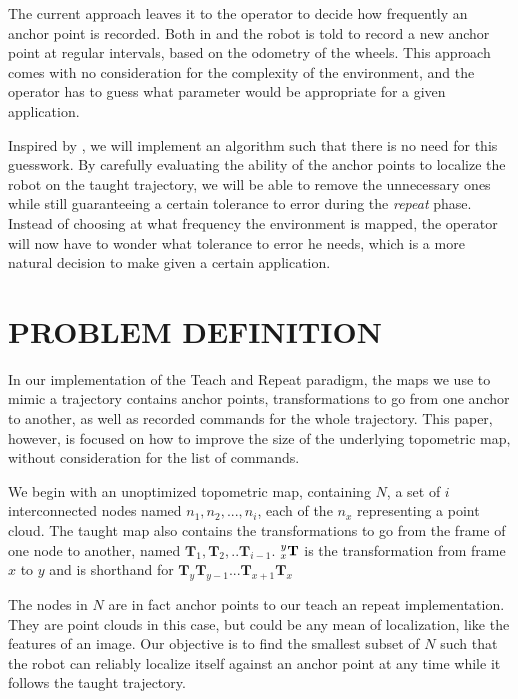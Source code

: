 \documentclass[letterpaper,10 pt,conference]{ieeeconf}
\newcommand{\mat}[1]{\mathbf{#1}}
\begin{document}
The current approach leaves it to the operator to decide how frequently an anchor point is
recorded. Both in \cite{Furgale10} and \cite{Sprunk13} the robot is told to record a new anchor
point at regular intervals, based on the odometry of the wheels. This approach comes with no
consideration for the complexity of the environment, and the operator has to guess what parameter
would be appropriate for a given application.

Inspired by \cite{Churchill15}, we will implement an algorithm such that there is no need for this
guesswork. By carefully evaluating the ability of the anchor points to localize the robot on the taught
trajectory, we will be able to remove the unnecessary ones while still guaranteeing a certain
tolerance to error during the \textit{repeat} phase. Instead of choosing at what frequency the
environment is mapped, the operator will now have to wonder what tolerance to error he needs, which
is a more natural decision to make given a certain application.


\section{PROBLEM DEFINITION}

In our implementation of the Teach and Repeat paradigm, the maps we use to mimic a
trajectory contains anchor points, transformations to go from one anchor to another, as well as
recorded commands for the whole trajectory. This paper, however, is focused on how to improve the
size of the underlying topometric map, without consideration for the list of commands.

We begin with an unoptimized topometric map, containing $N$, a set of $i$
interconnected nodes named $n_1, n_2, ..., n_{i}$, each of the $n_x$ representing
a point cloud. The taught map also contains the transformations to go from the
frame of one node to another, named $\mat{T}_1, \mat{T}_2,..
\mat{T}_{i-1}$.
$\prescript{y}{x}{\mat{T}}$ is the transformation from frame $x$ to $y$ and is
shorthand for $\mat{T}_y \mat{T}_{y-1}...\mat{T}_{x+1} \mat{T}_x$ 

The nodes in $N$ are in fact anchor points to our teach an
repeat implementation. They are point clouds in this case, but could be any mean
of localization, like the features of an image. Our objective is to find the
smallest subset of $N$ such that the robot can reliably localize itself against
an anchor point at any time while it follows the taught trajectory.
\end{document}
